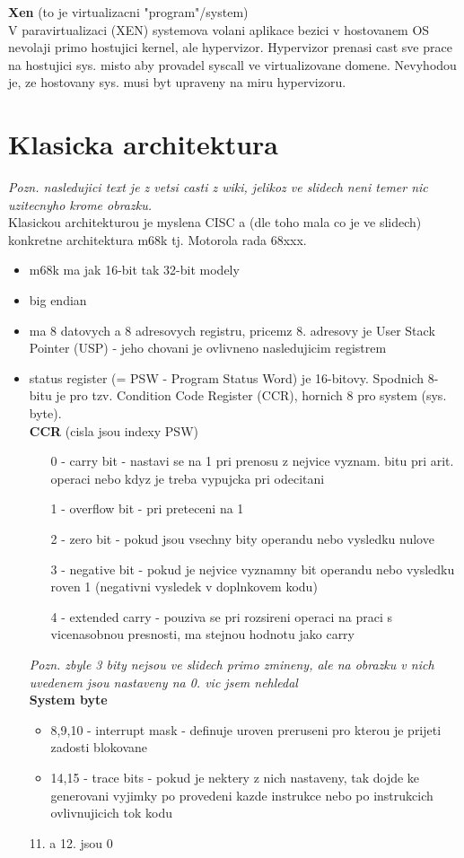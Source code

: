 \documentclass[10pt]{article}
\begin{document}
\textbf{Xen} (to je virtualizacni "program"/system)\\
V paravirtualizaci (XEN) systemova volani aplikace bezici v hostovanem OS nevolaji primo hostujici kernel, ale hypervizor. Hypervizor prenasi cast sve prace na hostujici sys. misto aby provadel syscall ve virtualizovane domene. Nevyhodou je, ze hostovany sys. musi byt upraveny na miru hypervizoru.
\section*{Klasicka architektura}
\textit{Pozn. nasledujici text je z vetsi casti z wiki, jelikoz ve slidech neni temer nic uzitecnyho krome obrazku.}\\[10pt]

Klasickou architekturou je myslena CISC a (dle toho mala co je ve slidech) konkretne architektura m68k tj. Motorola rada 68xxx.

\begin{itemize}
\item m68k ma jak 16-bit tak 32-bit modely
\item big endian
\item ma 8 datovych a 8 adresovych registru, pricemz 8. adresovy je User Stack Pointer (USP) - jeho chovani je ovlivneno nasledujicim registrem
\item status register (= PSW - Program Status Word) je 16-bitovy. Spodnich 8-bitu je pro tzv. Condition Code Register (CCR), hornich 8 pro system (sys. byte).\\
\newpage
\textbf{CCR} (cisla jsou indexy PSW)
	\begin{itemize}
	\item[0] - carry bit - nastavi se na 1 pri prenosu z nejvice vyznam. bitu pri arit. operaci nebo kdyz je treba vypujcka pri odecitani
	\item[1] - overflow bit - pri preteceni na 1
	\item[2] - zero bit - pokud jsou vsechny bity operandu nebo vysledku nulove
	\item[3] - negative bit - pokud je nejvice vyznamny bit operandu nebo vysledku roven 1 (negativni vysledek v doplnkovem kodu)
	\item[4] - extended carry - pouziva se pri rozsireni operaci na praci s vicenasobnou presnosti, ma stejnou hodnotu jako carry
	\end{itemize}
	\textit{Pozn. zbyle 3 bity nejsou ve slidech primo zmineny, ale na obrazku v nich uvedenem jsou nastaveny na 0. vic jsem nehledal}\\
\textbf{System byte}
	\begin{itemize}
	\item 8,9,10 - interrupt mask - definuje uroven preruseni pro kterou je prijeti zadosti blokovane
	\item 14,15 - trace bits - pokud je nektery z nich nastaveny, tak dojde ke generovani vyjimky po provedeni kazde instrukce nebo po instrukcich ovlivnujicich tok kodu
	\end{itemize}
	11. a 12. jsou 0
\end{itemize}
\end{document}
